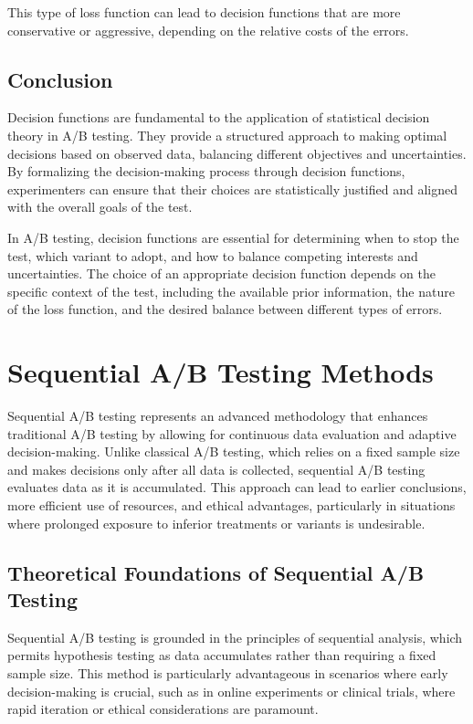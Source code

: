 \documentclass[magisterska, english]{pwr_wmat_praca_dyplomowa}
\theoremstyle{plain}
\numberwithin{theorem}{chapter}
\theoremstyle{definition}
\numberwithin{theorem}{chapter}
\begin{document}
 This type of loss function can lead to decision functions that are more conservative or aggressive, depending on the relative costs of the errors.

\subsection{Conclusion}
Decision functions are fundamental to the application of statistical decision theory in A/B testing. They provide a structured approach to making optimal decisions based on observed data, balancing different objectives and uncertainties. By formalizing the decision-making process through decision functions, experimenters can ensure that their choices are statistically justified and aligned with the overall goals of the test.

In A/B testing, decision functions are essential for determining when to stop the test, which variant to adopt, and how to balance competing interests and uncertainties. The choice of an appropriate decision function depends on the specific context of the test, including the available prior information, the nature of the loss function, and the desired balance between different types of errors.


\section{Sequential A/B Testing Methods}

Sequential A/B testing represents an advanced methodology that enhances traditional A/B testing by allowing for continuous data evaluation and adaptive decision-making. Unlike classical A/B testing, which relies on a fixed sample size and makes decisions only after all data is collected, sequential A/B testing evaluates data as it is accumulated. This approach can lead to earlier conclusions, more efficient use of resources, and ethical advantages, particularly in situations where prolonged exposure to inferior treatments or variants is undesirable.

\subsection{Theoretical Foundations of Sequential A/B Testing}

Sequential A/B testing is grounded in the principles of sequential analysis, which permits hypothesis testing as data accumulates rather than requiring a fixed sample size. This method is particularly advantageous in scenarios where early decision-making is crucial, such as in online experiments or clinical trials, where rapid iteration or ethical considerations are paramount.
\end{document}
